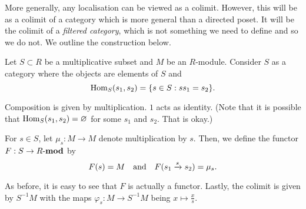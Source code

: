 \documentclass[12pt]{article}
\begin{document}
\begin{rem}
	More generally, any localisation can be viewed as a colimit. However, this will be as a colimit of a category which is more general than a directed poset. It will be the colimit of a \emph{filtered category}, which is not something we need to define and so we do not. We outline the construction below.

	Let $S \subset R$ be a multiplicative subset and $M$ be an $R$-module. Consider $S$ as a category where the objects are elements of $S$ and
	\begin{equation*} 
		\operatorname{Hom}_{S}(s_{1}, s_{2}) = \{s \in S : ss_{1} = s_{2}\}.
	\end{equation*}

	Composition is given by multiplication. $1$ acts as identity. (Note that it is possible that $\operatorname{Hom}_{S}(s_{1}, s_{2}) = \varnothing$ for some $s_{1}$ and $s_{2}$. That is okay.)

	For $s \in S$, let $\mu_{s} : M \to M$ denote multiplication by $s$. Then, we define the functor $F : S \to R\text{-}\mathbf{mod}$ by
	\begin{equation*} 
		F(s) = M \quad\text{and}\quad F(s_{1} \xrightarrow{s} s_{2}) = \mu_{s}.
	\end{equation*}

	As before, it is easy to see that $F$ is actually a functor. Lastly, the colimit is given by $S^{-1}M$ with the maps $\varphi_{s} : M \to S^{-1}M$ being $x \mapsto \frac{x}{s}$.
\end{rem}







\end{document}
